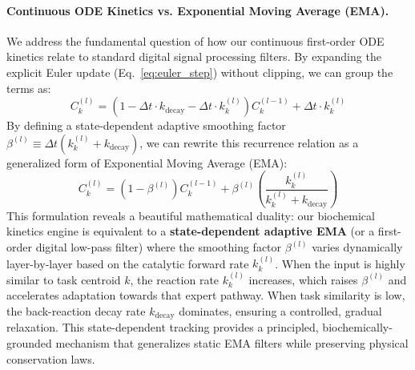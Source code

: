\paragraph{Continuous ODE Kinetics vs. Exponential Moving Average (EMA).}
We address the fundamental question of how our continuous first-order ODE kinetics relate to standard digital signal processing filters. By expanding the explicit Euler update (Eq.~\ref{eq:euler_step}) without clipping, we can group the terms as:
\begin{equation}
C_k^{(l)} = (1 - \Delta t \cdot k_{\text{decay}} - \Delta t \cdot k_k^{(l)}) C_k^{(l-1)} + \Delta t \cdot k_k^{(l)}
\end{equation}
By defining a state-dependent adaptive smoothing factor $\beta^{(l)} \equiv \Delta t (k_k^{(l)} + k_{\text{decay}})$, we can rewrite this recurrence relation as a generalized form of Exponential Moving Average (EMA):
\begin{equation}
C_k^{(l)} = (1 - \beta^{(l)}) C_k^{(l-1)} + \beta^{(l)} \left(\frac{k_k^{(l)}}{k_k^{(l)} + k_{\text{decay}}}\right)
\label{eq:ema_equivalence}
\end{equation}
This formulation reveals a beautiful mathematical duality: our biochemical kinetics engine is equivalent to a \textbf{state-dependent adaptive EMA} (or a first-order digital low-pass filter) where the smoothing factor $\beta^{(l)}$ varies dynamically layer-by-layer based on the catalytic forward rate $k_k^{(l)}$. When the input is highly similar to task centroid $k$, the reaction rate $k_k^{(l)}$ increases, which raises $\beta^{(l)}$ and accelerates adaptation towards that expert pathway. When task similarity is low, the back-reaction decay rate $k_{\text{decay}}$ dominates, ensuring a controlled, gradual relaxation. This state-dependent tracking provides a principled, biochemically-grounded mechanism that generalizes static EMA filters while preserving physical conservation laws.

